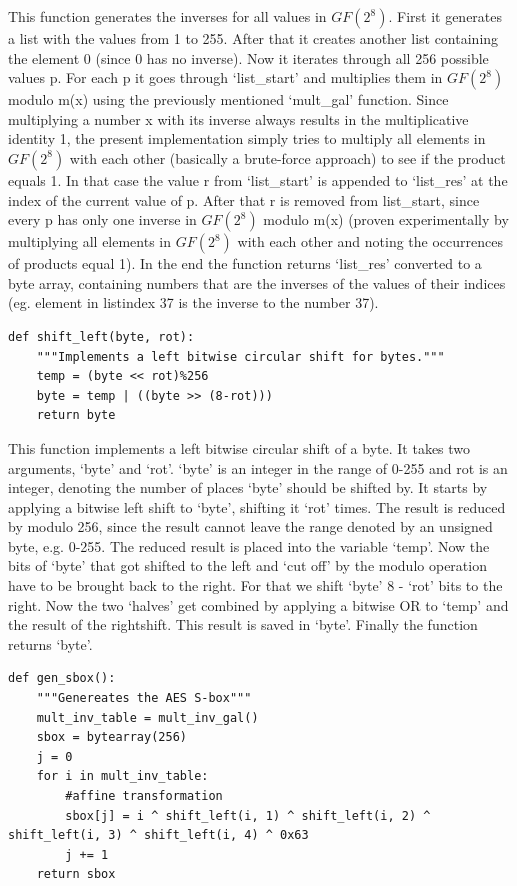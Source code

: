 This function generates the inverses for all values in $GF(2^{8})$. First it
generates a list with the values from 1 to 255. After that it creates
another list containing the element 0 (since 0 has no inverse). Now it
iterates through all 256 possible values p. For each p it goes through
`list\_start' and multiplies them in $GF(2^{8})$ modulo m(x) using the
previously mentioned `mult\_gal' function. Since multiplying a number x
with its inverse always results in the multiplicative identity 1, the
present implementation simply tries to multiply all elements in $GF(2^{8})$
with each other (basically a brute-force approach) to see if the product
equals 1. In that case the value r from `list\_start' is appended to
`list\_res' at the index of the current value of p. After that r is
removed from list\_start, since every p has only one inverse in $GF(2^{8})$
modulo m(x) (proven experimentally by multiplying all elements in $GF(2^{8})$
with each other and noting the occurrences of products equal 1). In the
end the function returns `list\_res' converted to a byte array,
containing numbers that are the inverses of the values of their indices
(eg. element in listindex 37 is the inverse to the number 37).

\begin{lstlisting}
def shift_left(byte, rot):
    """Implements a left bitwise circular shift for bytes."""
    temp = (byte << rot)%256
    byte = temp | ((byte >> (8-rot)))
    return byte
\end{lstlisting}

This function implements a left bitwise circular shift of a byte. It
takes two arguments, `byte' and `rot'. `byte' is an integer in the range
of 0-255 and rot is an integer, denoting the number of places `byte'
should be shifted by. It starts by applying a bitwise left shift to
`byte', shifting it `rot' times. The result is reduced by modulo 256,
since the result cannot leave the range denoted by an unsigned byte,
e.g. 0-255. The reduced result is placed into the variable `temp'. Now
the bits of `byte' that got shifted to the left and `cut off' by the
modulo operation have to be brought back to the right. For that we shift
`byte' 8 - `rot' bits to the right. Now the two `halves' get combined by
applying a bitwise OR to `temp' and the result of the rightshift. This
result is saved in `byte'. Finally the function returns `byte'.

\begin{lstlisting}
def gen_sbox():
    """Genereates the AES S-box"""
    mult_inv_table = mult_inv_gal()
    sbox = bytearray(256)
    j = 0
    for i in mult_inv_table:
        #affine transformation
        sbox[j] = i ^ shift_left(i, 1) ^ shift_left(i, 2) ^ shift_left(i, 3) ^ shift_left(i, 4) ^ 0x63
        j += 1
    return sbox
\end{lstlisting}


